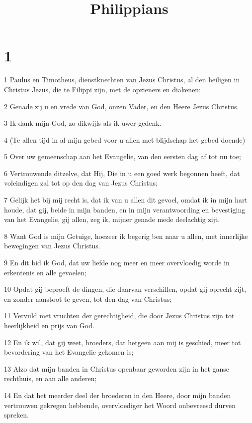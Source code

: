 

\title{Philippians}



\chapter{1}

\par 1 Paulus en Timotheus, dienstknechten van Jezus Christus, al den heiligen in Christus Jezus, die te Filippi zijn, met de opzieners en diakenen:
\par 2 Genade zij u en vrede van God, onzen Vader, en den Heere Jezus Christus.
\par 3 Ik dank mijn God, zo dikwijls als ik uwer gedenk.
\par 4 (Te allen tijd in al mijn gebed voor u allen met blijdschap het gebed doende)
\par 5 Over uw gemeenschap aan het Evangelie, van den eersten dag af tot nu toe;
\par 6 Vertrouwende ditzelve, dat Hij, Die in u een goed werk begonnen heeft, dat voleindigen zal tot op den dag van Jezus Christus;
\par 7 Gelijk het bij mij recht is, dat ik van u allen dit gevoel, omdat ik in mijn hart houde, dat gij, beide in mijn banden, en in mijn verantwoording en bevestiging van het Evangelie, gij allen, zeg ik, mijner genade mede deelachtig zijt.
\par 8 Want God is mijn Getuige, hoezeer ik begerig ben naar u allen, met innerlijke bewegingen van Jezus Christus.
\par 9 En dit bid ik God, dat uw liefde nog meer en meer overvloedig worde in erkentenis en alle gevoelen;
\par 10 Opdat gij beproeft de dingen, die daarvan verschillen, opdat gij oprecht zijt, en zonder aanstoot te geven, tot den dag van Christus;
\par 11 Vervuld met vruchten der gerechtigheid, die door Jezus Christus zijn tot heerlijkheid en prijs van God.
\par 12 En ik wil, dat gij weet, broeders, dat hetgeen aan mij is geschied, meer tot bevordering van het Evangelie gekomen is;
\par 13 Alzo dat mijn banden in Christus openbaar geworden zijn in het ganse rechthuis, en aan alle anderen;
\par 14 En dat het meerder deel der broederen in den Heere, door mijn banden vertrouwen gekregen hebbende, overvloediger het Woord onbevreesd durven spreken.
